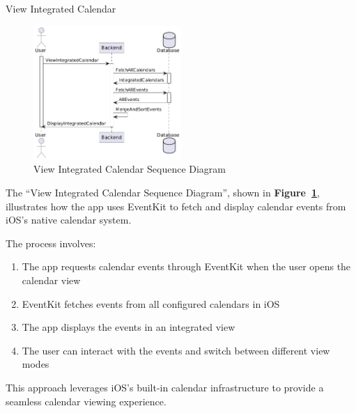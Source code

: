 \begin{usecase}{View Integrated Calendar}
{\begin{itemize}
        \end{itemize}
    }
\end{usecase}

\begin{figure}[!h]
    \centering
    \includegraphics[width=0.5\textwidth]{images/docs/diagrams/sequence-diagrams/all-sequence-diagrams/View Integrated Calendar.png}
    \caption{View Integrated Calendar Sequence Diagram}
    \label{fig:seq/view-integrated-calendar}
\end{figure}

The ``View Integrated Calendar Sequence Diagram'', shown in \textbf{Figure~\ref{fig:seq/view-integrated-calendar}}, illustrates how the app uses EventKit to fetch and display calendar events from iOS's native calendar system.

The process involves:
\begin{enumerate}
    \item The app requests calendar events through EventKit when the user opens the calendar view
    \item EventKit fetches events from all configured calendars in iOS
    \item The app displays the events in an integrated view
    \item The user can interact with the events and switch between different view modes
\end{enumerate}

This approach leverages iOS's built-in calendar infrastructure to provide a seamless calendar viewing experience.